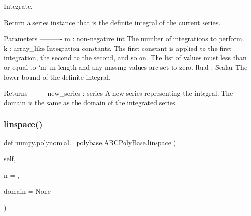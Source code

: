 \begin{DoxyVerb}Integrate.

Return a series instance that is the definite integral of the
current series.

Parameters
----------
m : non-negative int
    The number of integrations to perform.
k : array_like
    Integration constants. The first constant is applied to the
    first integration, the second to the second, and so on. The
    list of values must less than or equal to `m` in length and any
    missing values are set to zero.
lbnd : Scalar
    The lower bound of the definite integral.

Returns
-------
new_series : series
    A new series representing the integral. The domain is the same
    as the domain of the integrated series.\end{DoxyVerb}
 \mbox{\label{classnumpy_1_1polynomial_1_1__polybase_1_1ABCPolyBase_ae8f0a0279bacb546970c0ac661f1c513}} 
\subsubsection{\texorpdfstring{linspace()}{linspace()}}
{\footnotesize\ttfamily def numpy.\+polynomial.\+\_\+polybase.\+A\+B\+C\+Poly\+Base.\+linspace (\begin{DoxyParamCaption}\item[{}]{self,  }\item[{}]{n = {},  }\item[{}]{domain = {\ttfamily None} }\end{DoxyParamCaption})}

